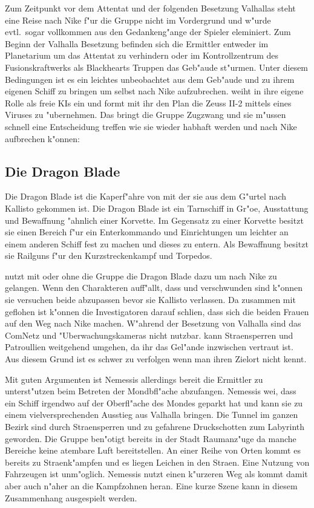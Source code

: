 Zum Zeitpunkt vor dem Attentat und der folgenden Besetzung Valhallas steht eine Reise nach Nike f"ur die Gruppe nicht im Vordergrund und w"urde evtl.~sogar vollkommen aus den Gedankeng"ange der Spieler eleminiert. Zum Beginn der Valhalla Besetzung befinden sich die Ermittler entweder im Planetarium um das Attentat zu verhindern oder im Kontrollzentrum des Fusionskraftwerks als Blackhearts Truppen das Geb"aude st"urmen. Unter diesem Bedingungen ist es \xl{} ein leichtes \ml{} unbeobachtet aus dem Geb"aude und zu ihrem eigenen Schiff zu bringen um selbst nach Nike aufzubrechen. \xl{} weiht \ml{} in ihre eigene Rolle als freie KIs ein und formt mit ihr den Plan die Zeuss II-2 mittels eines Viruses zu "ubernehmen. Das bringt die Gruppe Zugzwang und sie m"ussen schnell eine Entscheidung treffen wie sie \ml{} wieder habhaft werden und nach Nike aufbrechen k"onnen:

\subsection{Die Dragon Blade}

Die Dragon Blade ist die Kaperf"ahre von \xl{} mit der sie aus dem G"urtel nach Kallisto gekommen ist. Die Dragon Blade 
ist ein Tarnschiff in Gr"o\3e, Ausstattung und Bewaffnung "ahnlich einer Korvette. Im Gegensatz zu einer Korvette 
besitzt sie einen Bereich f"ur ein Enterkommando und Einrichtungen um leichter an einem anderen Schiff fest zu machen 
und dieses zu entern. Als Bewaffnung besitzt sie Railguns f"ur den Kurzstreckenkampf und Torpedos.

\xl{} nutzt mit oder ohne die Gruppe die Dragon Blade dazu um nach Nike zu gelangen. Wenn den Charakteren auff"allt, dass \ml{} und \xl{} verschwunden sind k"onnen sie versuchen beide abzupassen bevor sie Kallisto verlassen. Da \xl{} zusammen mit \ml{} geflohen ist k"onnen die Investigatoren darauf schli\3en, dass sich die beiden Frauen auf den Weg nach Nike machen. W"ahrend der Besetzung von Valhalla sind das ComNetz und "Uberwachungskameras nicht nutzbar. \xl{} kann Stra\3ensperren und Patroullien weitgehend umgehen, da ihr das Gel"ande inzwischen vertraut ist. Aus diesem Grund ist es schwer \xl{} zu verfolgen wenn man ihren Zielort nicht kennt. 

Mit guten Argumenten ist Nemessis allerdings bereit die Ermittler zu unterst"utzen \xl{} beim Betreten der Mondbfl"ache abzufangen. Nemessis wei\3, dass \xl{} ein Schiff irgendwo auf der Oberfl"ache des Mondes geparkt hat und kann sie zu einem vielversprechenden Ausstieg aus Valhalla bringen. Die Tunnel im ganzen Bezirk sind durch Stra\3ensperren und zu gefahrene Druckschotten zum Labyrinth geworden. Die Gruppe ben"otigt bereits in der Stadt Raumanz"uge da manche Bereiche keine atembare Luft bereitstellen. An einer Reihe von Orten kommt es bereits zu Stra\3enk"ampfen und es liegen Leichen in den Stra\3en. Eine Nutzung von Fahrzeugen ist unm"oglich. Nemessis nutzt einen k"urzeren Weg als \xl{} kommt damit aber auch n"aher an die Kampfzohnen heran. Eine kurze Szene kann in diesem Zusammenhang ausgespielt werden.

